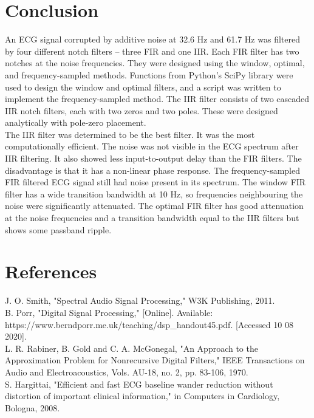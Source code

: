 \documentclass[12pt]{article}
\begin{document}
\section{Conclusion}
An ECG signal corrupted by additive noise at 32.6 Hz and 61.7 Hz was filtered by four different notch
filters – three FIR and one IIR. Each FIR filter has two notches at the noise frequencies. They were
designed using the window, optimal, and frequency-sampled methods. Functions from Python’s SciPy
library were used to design the window and optimal filters, and a script was written to implement
the frequency-sampled method. The IIR filter consists of two cascaded IIR notch filters, each with
two zeros and two poles. These were designed analytically with pole-zero placement.\\

\noindent The IIR filter was determined to be the best filter. It was the most computationally efficient.
The noise was not visible in the ECG spectrum after IIR filtering. It also showed less input-to-output
delay than the FIR filters. The disadvantage is that it has a non-linear phase response. The frequency-sampled
FIR filtered ECG signal still had noise present in its spectrum. The window FIR filter has a wide transition
bandwidth at 10 Hz, so frequencies neighbouring the noise were significantly attenuated. The optimal FIR
filter has good attenuation at the noise frequencies and a transition bandwidth equal to the IIR filters
but shows some passband ripple. 

\section*{References}
 

\noindent[1] J. O. Smith, "Spectral Audio Signal Processing," W3K Publishing, 2011.\\

\noindent[2] B. Porr, "Digital Signal Processing," [Online]. Available: \\
https://www.berndporr.me.uk/teaching/dsp\_handout45.pdf. [Accessed 10 08 2020].\\

\noindent[3] L. R. Rabiner, B. Gold and C. A. McGonegal, "An Approach to the Approximation Problem for Nonrecursive Digital Filters," IEEE Transactions on Audio and Electroacoustics, Vols. AU-18, no. 2, pp. 83-106, 1970.\\

\noindent[4] S. Hargittai, "Efficient and fast ECG baseline wander reduction without distortion of important clinical information," in Computers in Cardiology, Bologna, 2008.\\
\end{document}
